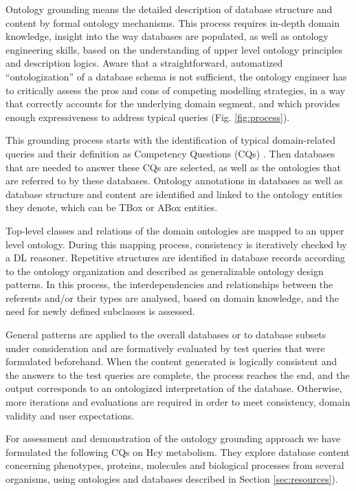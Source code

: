 Ontology grounding means the detailed description of database structure and content by formal ontology mechanisms. This process requires in-depth domain knowledge, insight into the way databases are populated, as well as ontology engineering skills, based on the understanding of upper level ontology principles and description logics.
Aware that a straightforward,  automatized ``ontologization'' of a database schema is not sufficient, the ontology engineer has to critically assess the pros and cons of competing modelling strategies, in a way that correctly accounts for the underlying domain segment, and which provides enough expressiveness to address typical queries (Fig. \ref{fig:process}). 

This grounding process starts with the identification of typical domain-related queries and their definition as Competency Questions (CQs) \citep{Gruninger1994}. Then databases that are needed to answer these CQs are selected, as well as the ontologies that are referred to by these databases. Ontology annotations in databases as well as database structure and content are identified and linked to the ontology entities they denote, which can be TBox or ABox entities. 

Top-level classes and relations of the domain ontologies are mapped to an upper level ontology. During this mapping process, consistency is iteratively checked by a DL reasoner. Repetitive structures are identified in database records according to the ontology organization and described as generalizable ontology design patterns. In this process, the interdependencies and relationships between the referents and/or their types are analysed, based on domain knowledge, and the need for newly defined subclasses is assessed. 

General patterns are applied to the overall databases or to database subsets under consideration and are formatively evaluated by test queries that were formulated beforehand. When the content generated is logically consistent and the answers to the test queries are complete, the process reaches the end, and the output corresponds to an ontologized interpretation of the database. Otherwise, more iterations and evaluations are required in order to meet consistency, domain validity and user expectations. 
  


For assessment and demonstration of the ontology grounding approach we have formulated the following CQs on Hcy metabolism. They explore database content concerning phenotypes, proteins, molecules and biological processes from several organisms, using ontologies and databases described in Section \ref{sec:resources}).


